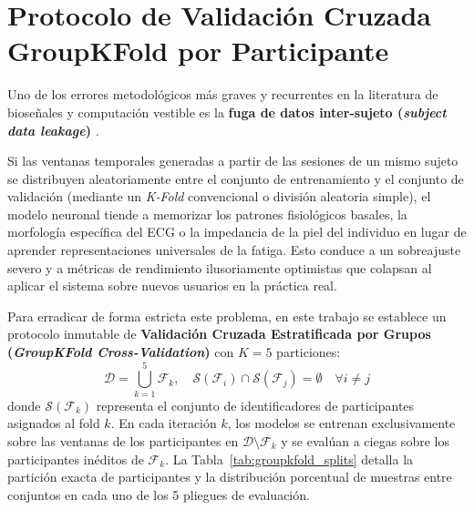 \section{Protocolo de Validación Cruzada GroupKFold por Participante}
\label{sec:exp_groupkfold}

Uno de los errores metodológicos más graves y recurrentes en la literatura de bioseñales y computación vestible es la \textbf{fuga de datos inter-sujeto (\textit{subject data leakage})} \cite{kalanadhabhatta2022fatigueset}. 

Si las ventanas temporales generadas a partir de las sesiones de un mismo sujeto se distribuyen aleatoriamente entre el conjunto de entrenamiento y el conjunto de validación (mediante un \textit{K-Fold} convencional o división aleatoria simple), el modelo neuronal tiende a memorizar los patrones fisiológicos basales, la morfología específica del ECG o la impedancia de la piel del individuo en lugar de aprender representaciones universales de la fatiga. Esto conduce a un sobreajuste severo y a métricas de rendimiento ilusoriamente optimistas que colapsan al aplicar el sistema sobre nuevos usuarios en la práctica real.

Para erradicar de forma estricta este problema, en este trabajo se establece un protocolo inmutable de \textbf{Validación Cruzada Estratificada por Grupos (\textit{GroupKFold Cross-Validation})} con $K=5$ particiones:
\begin{equation}
    \mathcal{D} = \bigcup_{k=1}^5 \mathcal{F}_k, \quad \mathcal{S}(\mathcal{F}_i) \cap \mathcal{S}(\mathcal{F}_j) = \emptyset \quad \forall i \ne j
\end{equation}
donde $\mathcal{S}(\mathcal{F}_k)$ representa el conjunto de identificadores de participantes asignados al fold $k$. En cada iteración $k$, los modelos se entrenan exclusivamente sobre las ventanas de los participantes en $\mathcal{D} \setminus \mathcal{F}_k$ y se evalúan a ciegas sobre los participantes inéditos de $\mathcal{F}_k$. La Tabla~\ref{tab:groupkfold_splits} detalla la partición exacta de participantes y la distribución porcentual de muestras entre conjuntos en cada uno de los 5 pliegues de evaluación.

